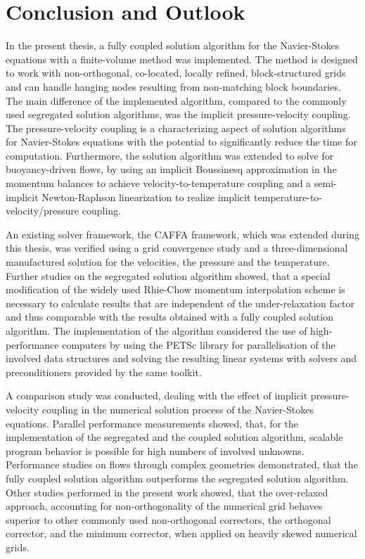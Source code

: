 \section{Conclusion and Outlook}
\label{sec:conclusion}

In the present thesis, a fully coupled solution algorithm for the Navier-Stokes equations with a finite-volume method was implemented. The method is designed to work with non-orthogonal, co-located, locally refined, block-structured grids and can handle hanging nodes resulting from non-matching block boundaries. The main difference of the implemented algorithm, compared to the commonly used segregated solution algorithms, was the implicit pressure-velocity coupling. The pressure-velocity coupling is a characterizing aspect of solution algorithms for Navier-Stokes equations with the potential to significantly reduce the time for computation. Furthermore, the solution algorithm was extended to solve for buoyancy-driven flows, by using an implicit Boussinesq approximation in the momentum balances to achieve velocity-to-temperature coupling and a semi-implicit Newton-Raphson linearization to realize implicit temperature-to-velocity/pressure coupling.

An existing solver framework, the CAFFA framework, which was extended during this thesis, was verified using a grid convergence study and a three-dimensional manufactured solution for the velocities, the pressure and the temperature. Further studies on the segregated solution algorithm showed, that a special modification of the widely used Rhie-Chow momentum interpolation scheme is necessary to calculate results that are independent of the under-relaxation factor and thus comparable with the results obtained with a fully coupled solution algorithm. The implementation of the algorithm considered the use of high-performance computers by using the PETSc library for parallelisation of the involved data structures and solving the resulting linear systems with solvers and preconditioners provided by the same toolkit.

A comparison study was conducted, dealing with the effect of implicit pressure-velocity coupling in the numerical solution process of the Navier-Stokes equations. Parallel performance measurements showed, that, for the implementation of the segregated and the coupled solution algorithm, scalable program behavior is possible for high numbers of involved unknowns. Performance studies on flows through complex geometries demonstrated, that the fully coupled solution algorithm outperforms the segregated solution algorithm. Other studies performed in the present work showed, that the over-relaxed approach, accounting for non-orthogonality of the numerical grid behaves superior to other commonly used non-orthogonal correctors, the orthogonal corrector, and the minimum corrector, when applied on heavily skewed numerical grids.

